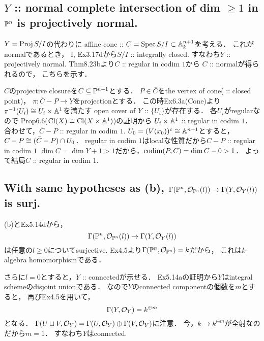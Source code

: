 \documentclass[a4paper]{jsarticle}
\newcommand{\Cl}{\mathrm{Cl}}
\begin{document}
    \subsection{$Y$ :: normal complete intersection of dim $ \geq 1$ in $\mathbb{P}^n$ is projectively normal.}
    $Y=\operatorname{Proj} S/I$の代わりに
    affine cone :: $C=\operatorname{Spec} S/I \subset \mathbb{A}^{n+1}_k$を考える．
    これがnormalであるとき，
    I, Ex3.17dから$S/I$ :: integrally closed.
    すなわち$Y$ :: projectively normal.
    Thm8.23bより$C$ :: regular in codim $1$から
    $C$ :: normalが得られるので，
    こちらを示す．

    $C$のprojective closureを$\bar{C} \subseteq \mathbb{P}^{n+1}$とする．
    $P \in \bar{C}$をthe vertex of cone( :: closed point)，
    $\pi: \bar{C}-P \to Y$をprojectionとする．
    この時Ex6.3a(Cone)より$\pi^{-1}(U_i) \cong U_i \times \mathbb{A}^1$を満たす
    open cover of $Y$ :: $\{U_i\}$が存在する．
    各$U_i$がregularなので
    Prop6.6($\Cl(X) \iso \Cl(X \times \affine^1)$)の証明から
    $U_i \times \mathbb{A}^1$ :: regular in codim $1$．
    合わせて，$\bar{C}-P$ :: regular in codim $1$.
    $U_0=(V(x_0))^c \cong \mathbb{A}^{n+1}$とすると，
    $C-P \cong (\bar{C}-P) \cap U_0$．
    regular in codim $1$はlocalな性質だから$C-P$ :: regular in codim $1$
    $\dim C=\dim Y+1>1$だから，$\operatorname{codim}(P, C)=\dim C-0>1$．
    よって結局$C$ :: regular in codim $1$.

    \subsection{With same hypotheses as (b), 
        $\Gamma(\mathbb{P}^n, \mathcal{O}_{\mathbb{P}^n}(l)) \to \Gamma(Y, \mathcal{O}_Y(l))$ is surj.}
    (b)とEx5.14dから，
    \[ \Gamma(\mathbb{P}^n, \mathcal{O}_{\mathbb{P}^n}(l)) \to \Gamma(Y, \mathcal{O}_Y(l)) \]
    は任意の$l \geq 0$についてsurjective.
    Ex4.5より$\Gamma(\mathbb{P}^n, \mathcal{O}_{\mathbb{P}^n})=k$だから，
    これは$k$-algebra homomorphismである．

    さらに$l=0$とすると，$Y$ :: connectedが示せる．
    Ex5.14aの証明から$Y$はintegral schemeのdisjoint unionである．
    なので$Y$のconnected componentの個数を$m$とすると，
    再びEx4.5を用いて，
    \[ \Gamma(Y, \mathcal{O}_Y)=k^{\oplus m} \]
    となる．
    $\Gamma(U \sqcup V, \mathcal{O}_Y)=\Gamma(U, \mathcal{O}_Y) \oplus \Gamma(V, \mathcal{O}_Y)$に注意．
    今，$k \to k^{\oplus m}$が全射なのだから$m=1$．
    すなわち$Y$はconnected.
\end{document}
